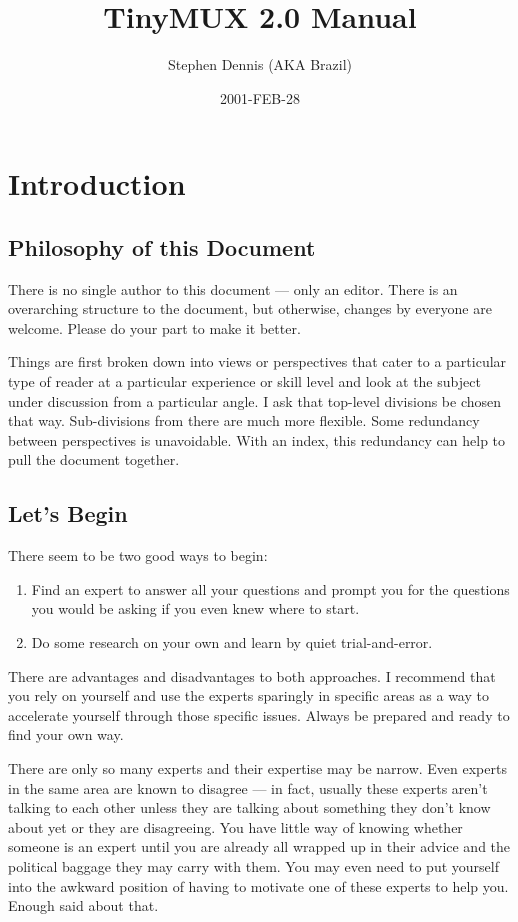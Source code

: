 \documentclass{book}
\title{TinyMUX 2.0 Manual}
\author{Stephen Dennis (AKA Brazil)}
\date{2001-FEB-28}
\begin{document}
\frontmatter
\maketitle
\mainmatter
\chapter{Introduction}
\section{Philosophy of this Document}
There is no single author to this document --- only an editor. There is an
overarching structure to the document, but otherwise, changes by everyone are
welcome. Please do your part to make it better.

Things are first broken down into views or perspectives that cater to a
particular type of reader at a particular experience or skill level and look
at the subject under discussion from a particular angle. I ask that top-level
divisions be chosen that way. Sub-divisions from there are much more flexible.
Some redundancy between perspectives is unavoidable. With an index, this
redundancy can help to pull the document together.
\section{Let's Begin}
There seem to be two good ways to begin:
\begin{enumerate}
\item
Find an expert to answer all your questions and prompt you for the questions
you would be asking if you even knew where to start.
\item
Do some research on your own and learn by quiet trial-and-error.
\end{enumerate}
There are advantages and disadvantages to both approaches. I recommend that
you rely on yourself and use the experts sparingly in specific areas as a way
to accelerate yourself through those specific issues. Always be prepared and
ready to find your own way.

There are only so many experts and their expertise may be narrow. Even experts
in the same area are known to disagree --- in fact, usually these experts
aren't talking to each other unless they are talking about something they don't
know about yet or they are disagreeing. You have little way of knowing whether
someone is an expert until you are already all wrapped up in their advice and
the political baggage they may carry with them. You may even need to put
yourself into the awkward position of having to motivate one of these experts
to help you. Enough said about that.
\end{document}
